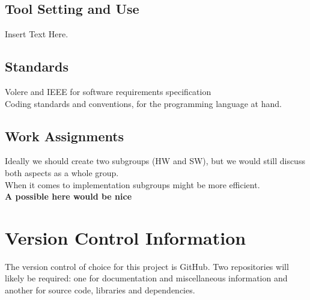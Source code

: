 \documentclass [12pt]{article}
\begin{document}
\subsection{Tool Setting and Use}
Insert Text Here.


\subsection{Standards}
Volere and IEEE for software requirements specification \\
Coding standards and conventions, for the programming language at hand.\\

\subsection{Work Assignments}

Ideally we should create two subgroups (HW and SW), but we would still
discuss both aspects as a whole group.\\ When it comes to implementation subgroups might be more efficient. \\

\textbf{A possible here would be nice }






\section{Version Control Information}
The version control of choice for this project is GitHub. Two repositories will likely be required: one for documentation and miscellaneous information and another for source code, libraries and dependencies. 
\end{document}
